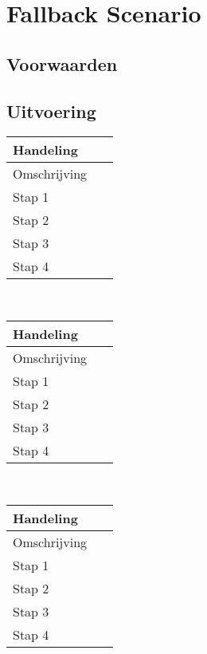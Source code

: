 \documentclass[10pt,a4paper]{report}
\begin{document}
\chapter{Fallback Scenario}
\section{Voorwaarden}
\section{Uitvoering}
\begin{tabular}{| l | l |}
\hline
\cellcolor[gray]{0.84}Handeling & \ \\
\hline
\cellcolor[gray]{0.84}Omschrijving & \ \\
\hline
\cellcolor[gray]{0.84}Stap 1 & \ \\
\hline
\cellcolor[gray]{0.84}Stap 2 & \ \\
\hline
\cellcolor[gray]{0.84}Stap 3 & \ \\
\hline
\cellcolor[gray]{0.84}Stap 4 & \ \\
\hline
\end{tabular}
\\

\begin{tabular}{| l | l |}
\hline
\cellcolor[gray]{0.84}Handeling & \ \\
\hline
\cellcolor[gray]{0.84}Omschrijving & \ \\
\hline
\cellcolor[gray]{0.84}Stap 1 & \ \\
\hline
\cellcolor[gray]{0.84}Stap 2 & \ \\
\hline
\cellcolor[gray]{0.84}Stap 3 & \ \\
\hline
\cellcolor[gray]{0.84}Stap 4 & \ \\
\hline
\end{tabular}
\\

\begin{tabular}{| l | l |}
\hline
\cellcolor[gray]{0.84}Handeling & \ \\
\hline
\cellcolor[gray]{0.84}Omschrijving & \ \\
\hline
\cellcolor[gray]{0.84}Stap 1 & \ \\
\hline
\cellcolor[gray]{0.84}Stap 2 & \ \\
\hline
\cellcolor[gray]{0.84}Stap 3 & \ \\
\hline
\cellcolor[gray]{0.84}Stap 4 & \ \\
\hline
\end{tabular}
\end{document}
